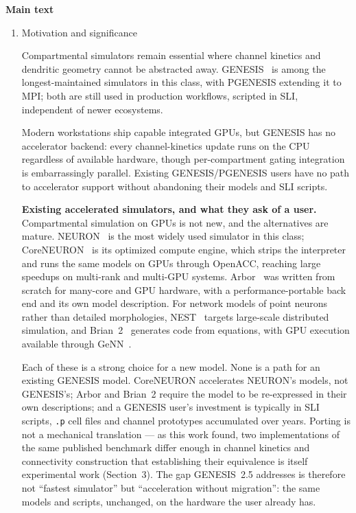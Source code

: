 \documentclass[preprint,12pt, a4paper]{elsarticle}
\begin{document}
\textbf{Main text}\\
\begin{enumerate}

\item Motivation and significance

Compartmental simulators remain essential where channel kinetics and dendritic geometry cannot be abstracted away. GENESIS~\cite{bower1998} is among the longest-maintained simulators in this class, with PGENESIS extending it to MPI; both are still used in production workflows, scripted in SLI, independent of newer ecosystems.

Modern workstations ship capable integrated GPUs, but GENESIS has no accelerator backend: every channel-kinetics update runs on the CPU regardless of available hardware, though per-compartment gating integration is embarrassingly parallel. Existing GENESIS/PGENESIS users have no path to accelerator support without abandoning their models and SLI scripts.

\textbf{Existing accelerated simulators, and what they ask of a user.} Compartmental simulation on GPUs is not new, and the alternatives are mature. NEURON~\cite{hines1997neuron} is the most widely used simulator in this class; CoreNEURON~\cite{kumbhar2019coreneuron} is its optimized compute engine, which strips the interpreter and runs the same models on GPUs through OpenACC, reaching large speedups on multi-rank and multi-GPU systems. Arbor~\cite{arbor2019} was written from scratch for many-core and GPU hardware, with a performance-portable back end and its own model description. For network models of point neurons rather than detailed morphologies, NEST~\cite{gewaltig2007nest} targets large-scale distributed simulation, and Brian~2~\cite{stimberg2019brian} generates code from equations, with GPU execution available through GeNN~\cite{yavuz2016genn}.

Each of these is a strong choice for a new model. None is a path for an existing GENESIS model. CoreNEURON accelerates NEURON's models, not GENESIS's; Arbor and Brian~2 require the model to be re-expressed in their own descriptions; and a GENESIS user's investment is typically in SLI scripts, \texttt{.p} cell files and channel prototypes accumulated over years. Porting is not a mechanical translation --- as this work found, two implementations of the same published benchmark differ enough in channel kinetics and connectivity construction that establishing their equivalence is itself experimental work (Section~3). The gap GENESIS~2.5 addresses is therefore not ``fastest simulator'' but ``acceleration without migration'': the same models and scripts, unchanged, on the hardware the user already has.


\end{enumerate}
\end{document}
